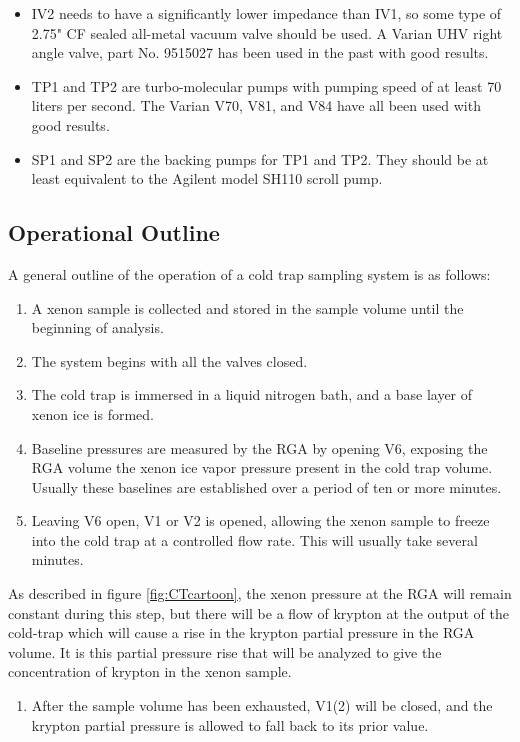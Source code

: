 \begin{itemize}
\item IV2 needs to have a significantly lower impedance than IV1, so some type of 2.75" CF sealed all-metal vacuum valve should be used. A Varian UHV right angle valve, part No. 9515027 has been used in the past with good results.
\item TP1 and TP2 are turbo-molecular pumps with pumping speed of at least 70 liters per second. The Varian V70, V81, and V84 have all been used with good results.
\item SP1 and SP2 are the backing pumps for TP1 and TP2. They should be at least equivalent to the Agilent model SH110 scroll pump.
\end{itemize}  

\subsection{Operational Outline}
\label{sec:outline}
A general outline of the operation of a cold trap sampling system is as follows:
\begin{enumerate}
\item A xenon sample is collected and stored in the sample volume until the beginning of analysis.
\item The system begins with all the valves closed.
\item  \label{step:analysis_start} The cold trap is immersed in a liquid nitrogen bath, and a base layer of xenon ice is formed.
\item Baseline pressures are measured by the RGA by opening V6, exposing the RGA volume the xenon ice vapor pressure present in the cold trap volume. Usually these baselines are established over a period of ten or more minutes.
\item \label{step:start_flow} Leaving V6 open, V1 or V2 is opened, allowing the xenon sample to freeze into the cold trap at a controlled flow rate. This will usually take several minutes. 
\end{enumerate}
\noindent As described in figure \ref{fig:CTcartoon}, the xenon pressure at the RGA will remain constant during this step, but there will be a flow of krypton at the output of the cold-trap which will cause a rise in the krypton partial pressure in the RGA volume. It is this partial pressure rise that will be analyzed to give the concentration of krypton in the xenon sample.
\begin{enumerate}[resume]
\item \label{step:stop_flow}After the sample volume has been exhausted, V1(2) will be closed, and the krypton partial pressure is allowed to fall back to its prior value.
\end{enumerate}
